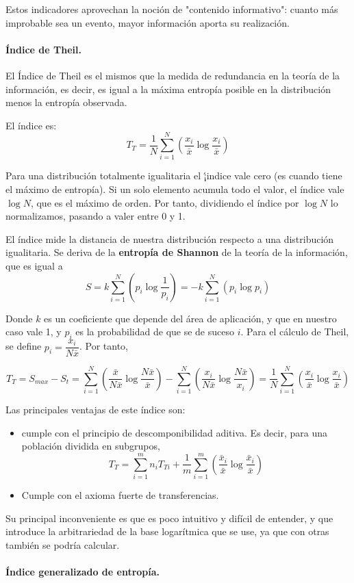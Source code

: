 


Estos indicadores aprovechan la noci\'on de "contenido informativo": cuanto m\'as improbable sea un evento, mayor informaci\'on aporta su realizaci\'on.

\paragraph{\'Indice de Theil.}

El \'Indice de Theil es el mismos que la medida de redundancia en la teor\'ia de la informaci\'on, es decir, es igual a la m\'axima entrop\'ia posible en la distribuci\'on menos la entrop\'ia observada.

El \'indice es:
\[T_T=\dfrac{1}{N}\sum_{i=1}^N\left(\dfrac{x_i}{\bar{x}}\log{\dfrac{x_i}{\bar{x}}}\right)\]

Para una distribuci\'on totalmente igualitaria el \'¡indice vale cero (es cuando tiene el m\'aximo de entrop\'ia). Si un solo elemento acumula todo el valor, el \'indice vale $\log{N}$, que es el m\'aximo de orden. Por tanto, dividiendo el \'indice por $\log{N}$ lo normalizamos, pasando a valer entre 0 y 1.

El \'indice mide la distancia de nuestra distribuci\'on respecto a una distribuci\'on igualitaria. Se deriva de la \textbf{entrop\'ia de Shannon} de la teor\'ia de la informaci\'on, que es igual a 
\[S=k\sum_{i=1}^N\left(p_i\log{\dfrac{1}{p_i}}\right)=-k\sum_{i=1}^N\left(p_i\log{p_i}\right)\]

Donde $k$ es un coeficiente que depende del \'area de aplicaci\'on, y que en nuestro caso vale 1, y $p_i$ es la probabilidad de que se de suceso $i$. Para el c\'alculo de Theil, se define $p_i=\dfrac{x_i}{N\bar{x}}$. Por tanto, 

\[T_T=S_{max}-S_t=\sum_{i=1}^N\left(\dfrac{\bar{x}}{N\bar{x}}\log{\dfrac{N\bar{x}}{\bar{x}}}\right)-\sum_{i=1}^N\left(\dfrac{x_i}{N\bar{x}}\log{\dfrac{N\bar{x}}{x_i}}\right)=\dfrac{1}{N}\sum_{i=1}^N\left(\dfrac{x_i}{\bar{x}}\log{\dfrac{x_i}{\bar{x}}}\right)\]

Las principales ventajas de este \'indice  son:

\begin{itemize}
\item cumple con el principio de descomponibilidad aditiva. Es decir, para una poblaci\'on dividida en subgrupos,
\[T_T=\sum_{i=1}^mn_iT_{Ti}+\dfrac{1}{m}\sum_{i=1}^m\left(\dfrac{\bar{x}_i}{\bar{x}}\log{\dfrac{\bar{x}_i}{\bar{x}}}\right)\]

\item Cumple con el axioma fuerte de transferencias.

\end{itemize}

Su principal inconveniente es que es poco intuitivo y dif\'icil de entender, y que introduce la arbitrariedad de la base logar\'itmica que se use, ya que con otras tambi\'en se podr\'ia calcular.

\paragraph{\'Indice generalizado de entrop\'ia.}










